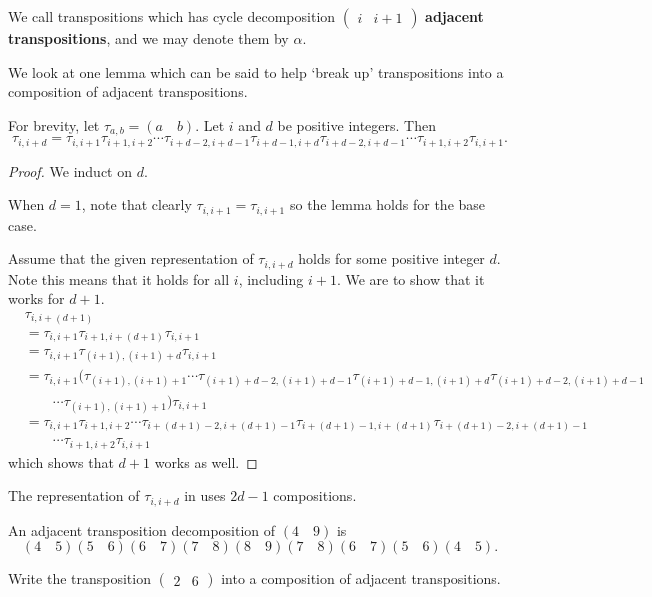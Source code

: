 We call transpositions which has cycle decomposition $\begin{pmatrix}i&i+1\end{pmatrix}$ \textbf{adjacent transpositions}, and we may denote them by $\alpha$.

We look at one lemma which can be said to help `break up' transpositions into a composition of adjacent transpositions.

\begin{lemma}\label{lemma-decompose-transposition}
    For brevity, let $\tau_{a,b} = (a\quad b)$. Let $i$ and $d$ be positive integers. Then
    \[
        \tau_{i,i+d} = \tau_{i,i+1}\tau_{i+1,i+2}\cdots\tau_{i+d-2,i+d-1}\tau_{i+d-1,i+d}\tau_{i+d-2,i+d-1}\cdots\tau_{i+1,i+2}\tau_{i,i+1}.
    \]
\end{lemma}

\begin{proof}
    We induct on $d$.

    When $d = 1$, note that clearly $\tau_{i,i+1} = \tau_{i,i+1}$ so the lemma holds for the base case.

    Assume that the given representation of $\tau_{i,i+d}$ holds for some positive integer $d$. Note this means that it holds for all $i$, including $i+1$. We are to show that it works for $d + 1$.
    \begin{align*}
        &\tau_{i, i+(d+1)}\\
        &= \tau_{i,i+1}\tau_{i+1,i+(d+1)}\tau_{i,i+1}\\
        &= \tau_{i,i+1}\tau_{(i+1),(i+1)+d}\tau_{i,i+1}\\
        &= \tau_{i,i+1}(\tau_{(i+1),(i+1)+1}\cdots\tau_{(i+1)+d-2,(i+1)+d-1}\tau_{(i+1)+d-1,(i+1)+d}\tau_{(i+1)+d-2,(i+1)+d-1}\\
        &\quad\quad\cdots\tau_{(i+1),(i+1)+1})\tau_{i,i+1}\\
        &= \tau_{i,i+1}\tau_{i+1,i+2}\cdots\tau_{i+(d+1)-2,i+(d+1)-1}\tau_{i+(d+1)-1,i+(d+1)}\tau_{i+(d+1)-2,i+(d+1)-1}\\
        &\quad\quad\cdots\tau_{i+1,i+2}\tau_{i,i+1}
    \end{align*}
    which shows that $d+1$ works as well.
\end{proof}
\begin{remark}
    The representation of $\tau_{i,i+d}$ in  uses $2d-1$ compositions.
\end{remark}
\begin{example}
    An adjacent transposition decomposition of $(4\quad9)$ is
    \[
        (4\quad 5)(5\quad 6)(6\quad 7)(7\quad 8)(8\quad 9)(7\quad 8)(6\quad 7)(5\quad 6)(4\quad 5).
    \]
\end{example}
\begin{exercise}
    Write the transposition $\begin{pmatrix}2&6\end{pmatrix}$ into a composition of adjacent transpositions.
\end{exercise}

